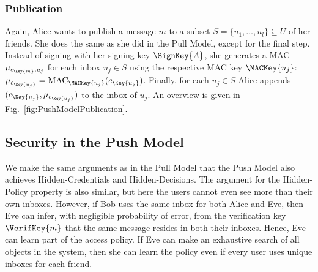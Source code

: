 \subsubsection<article>{Publication}

Again, Alice wants to publish a message \(m\) to a subset \(S = \{u_1, \ldots, 
  u_l\}\subseteq U\) of her friends.
She does the same as she did in the Pull Model, except for the final step.
Instead of signing with her signing key \(\SignKey{A}\), she generates 
a \ac{MAC} \(\mu_{c_{\Key{m}}, u_j}\) for each inbox \(u_j\in S\) using the 
respective \ac{MAC} key \(\MACKey{u_j}\): \(\mu_{c_{\Key{u_j}}} 
  = \MAC_{\MACKey{u_j}}( c_{\Key{u_j}} )\).
Finally, for each \(u_j\in S\) Alice appends \((c_{\Key{u_j}}, 
  \mu_{c_{\Key{u_j}}})\) to the inbox of \(u_j\).
An overview is given in Fig.~\ref{fig:PushModelPublication}.

\subsection<article>{Security in the Push Model}\label{sec:PushModelSec}


We make the same arguments as in the Pull Model that the Push Model also 
achieves Hidden-Credentials and Hidden-Decisions.
The argument for the Hidden-Policy property is also similar, but here the users 
cannot even see more than their own inboxes.
However, if Bob uses the same inbox for both Alice and Eve, then Eve can infer, 
with negligible probability of error, from the verification key 
\(\VerifKey{m}\) that the same message resides in both their inboxes.
Hence, Eve can learn part of the access policy.
If Eve can make an exhaustive search of all objects in the system, then she can 
learn the policy even if every user uses unique inboxes for each friend.

